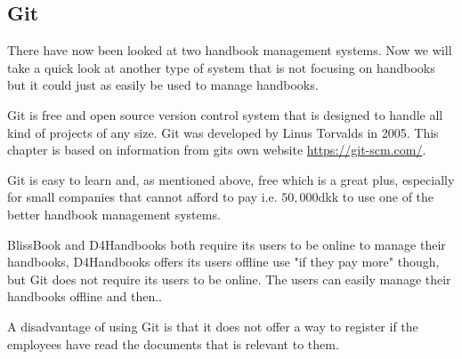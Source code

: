\subsection{Git}
There have now been looked at two handbook management systems. Now we will take a quick look at another type of system that is not focusing on handbooks but it could just as easily be used to manage handbooks.

Git is free and open source version control system that is designed to handle all kind of projects of any size. Git was developed by Linus Torvalds in 2005. This chapter is based on information from gits own website \url{https://git-scm.com/}.

Git is easy to learn and, as mentioned above, free which is a great plus, especially for small companies that cannot afford to pay i.e. $50,000$dkk to use one of the better handbook management systems.

BlissBook and D4Handbooks both require its users to be online to manage their handbooks, D4Handbooks offers its users offline use "if they pay more" though, but Git does not require its users to be online. The users can easily manage their handbooks offline and then.. %

A disadvantage of using Git is that it does not offer a way to register if the employees have read the documents that is relevant to them.
